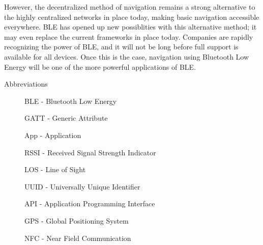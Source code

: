 \documentclass{sig-alternate}
\begin{document}
However, the decentralized method of navigation
remains a strong alternative to the highly centralized networks in
place today, making basic navigation accessible everywhere.
BLE has opened up new possiblities with this alternative method;
it may even replace the current frameworks in place today. 
Companies are rapidly recognizing the power of BLE, and it
will not be long before full support is available for all devices.
Once this is the case, navigation using Bluetooth Low
Energy will be one of the more powerful applications of BLE.


    
  

\appendix
\label{app}
Abbreviations

\begin{description}
	\item[] BLE - Bluetooth Low Energy 
	\item[] GATT - Generic Attribute 
	\item[] App - Application 
	\item[] RSSI - Received Signal Strength Indicator 
	\item[] LOS - Line of Sight
	\item[] UUID - Universally Unique Identifier
	\item[] API - Application Programming Interface
	\item[] GPS - Global Positioning System
	\item[] NFC - Near Field Communication
\end{description}
\end{document}
